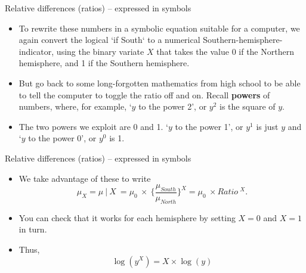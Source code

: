 \documentclass[10pt]{beamer}\usepackage[]{graphicx}\usepackage[]{color}
\begin{document}
	\begin{frame}[fragile]{Relative differences (ratios) -- expressed in symbols}
			
		\begin{itemize}
			\item To rewrite these numbers in a symbolic equation suitable for a computer, we  again convert the logical `if South` to a numerical Southern-hemisphere-indicator, using the binary variate $X$ that takes the value 0 if the Northern hemisphere, and  1 if the Southern hemisphere.
			
			\item But go back to  some long-forgotten mathematics from high school to be able to tell the computer to toggle the ratio off and on. Recall \textbf{powers} of numbers, where, for example, 
			`$y$ to the power 2', or $y^2$ is the square of $y$. 
			
			\item The two powers we exploit are 0 and 1. `$y$ to the power 1', or $y^1$ is just $y$ and `$y$ to the power 0', or $y^0$ is 1.
			

		\end{itemize}
			
			
	\end{frame}
	
	
		\begin{frame}[fragile]{Relative differences (ratios) -- expressed in symbols}
		
		\begin{itemize}
	
			
			\item We take advantage of these to write
			$$\mu_X = \mu \ | \ X  \ = \mu_0 \ \times \  \Big\{ \frac{\mu_{South}}{\mu_{North}}\Big\}^X = \mu_0 \ \times Ratio \ ^ X.$$ 
			
			\item You can check that it works for each hemisphere by setting $X=0$ and $X=1$ in turn.
			
			\item Thus, $$\log(y^X) = X \times \log(y)$$  
		\end{itemize}
		
		
	\end{frame}
	
	
	
	
\end{document}
